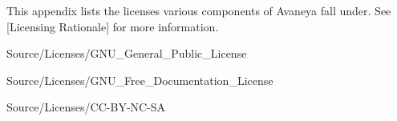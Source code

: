 
This appendix lists the licenses various components of Avaneya fall under. See [Licensing Rationale] for more information.

\component Source/Licenses/GNU_General_Public_License

\page
{}
\component Source/Licenses/GNU_Free_Documentation_License

\page
{}
\component Source/Licenses/CC-BY-NC-SA


